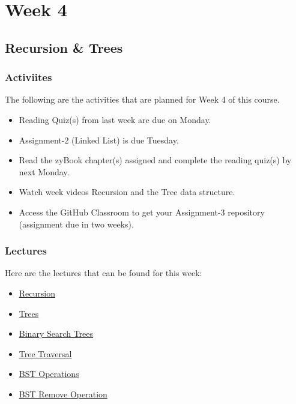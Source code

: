 \clearpage

\chapter{Week 4}

\section{Recursion \& Trees}

\horizontalline

\subsection{Activiites}
The following are the activities that are planned for Week 4 of this course.
\begin{itemize}
    \item Reading Quiz(s) from last week are due on Monday.
    \item Assignment-2 (Linked List) is due Tuesday.
    \item Read the zyBook chapter(s) assigned and complete the reading quiz(s) by next Monday.
    \item Watch week videos Recursion and the Tree data structure.
    \item Access the GitHub Classroom to get your Assignment-3 repository  (assignment due in two weeks).
\end{itemize}

\subsection{Lectures}
Here are the lectures that can be found for this week:
\begin{itemize}
    \item \href{https://applied.cs.colorado.edu/mod/hvp/view.php?id=45909}{Recursion}
    \item \href{https://applied.cs.colorado.edu/mod/hvp/view.php?id=45910}{Trees}
    \item \href{https://applied.cs.colorado.edu/mod/hvp/view.php?id=45911}{Binary Search Trees}
    \item \href{https://applied.cs.colorado.edu/mod/hvp/view.php?id=45912}{Tree Traversal}
    \item \href{https://applied.cs.colorado.edu/mod/hvp/view.php?id=45913}{BST Operations}
    \item \href{https://applied.cs.colorado.edu/mod/hvp/view.php?id=45914}{BST Remove Operation}
\end{itemize}


